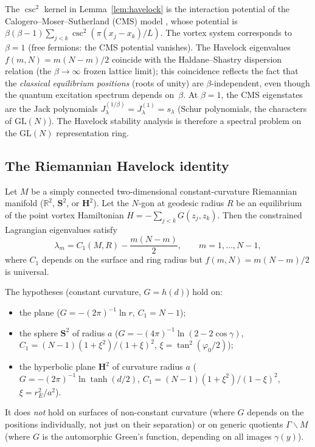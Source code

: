 \begin{remark}
The $\csc^2$ kernel in Lemma~\ref{lem:havelock} is the
interaction potential of the Calogero--Moser--Sutherland (CMS)
model \citep{Sutherland1971, CalogeroJMP1971}, whose potential
is $\beta(\beta{-}1)\sum_{j<k}\csc^2(\pi(x_j{-}x_k)/L)$.
The vortex system corresponds to $\beta = 1$
(free fermions: the CMS potential vanishes).
The Havelock eigenvalues $f(m,N) = m(N{-}m)/2$ coincide with
the Haldane--Shastry dispersion relation (the $\beta \to \infty$
frozen lattice limit); this coincidence reflects the fact that the
\emph{classical equilibrium positions} (roots of unity) are
$\beta$-independent, even though the quantum excitation spectrum
depends on~$\beta$.
At $\beta = 1$, the CMS eigenstates are the Jack polynomials
$J_\lambda^{(1/\beta)} = J_\lambda^{(1)} = s_\lambda$
(Schur polynomials, the characters of $\mathrm{GL}(N)$).
The Havelock stability analysis is therefore a spectral
problem on the $\mathrm{GL}(N)$ representation ring.
\end{remark}

\subsection{The Riemannian Havelock identity}
\label{sec:riemannian}

\begin{theorem}
\label{thm:riemannian-havelock}
Let $M$ be a simply connected two-dimensional
constant-curvature Riemannian manifold
($\mathbb{R}^2$, $\mathbf{S}^2$, or $\mathbf{H}^2$).
Let the $N$-gon at geodesic radius $R$ be an equilibrium of the
point vortex Hamiltonian $H = -\sum_{j<k}G(z_j,z_k)$.
Then the constrained Lagrangian eigenvalues satisfy
\begin{equation}\label{eq:riemannian-havelock}
  \lambda_m = C_1(M, R) - \frac{m(N-m)}{2},
  \qquad m = 1, \ldots, N-1,
\end{equation}
where $C_1$ depends on the surface and ring radius but
$f(m,N) = m(N{-}m)/2$ is universal.
\end{theorem}

\noindent
The hypotheses (constant curvature, $G = h(d)$) hold on:
\begin{itemize}
  \item the plane ($G = -(2\pi)^{-1}\ln r$, $C_1 = N{-}1$);
  \item the sphere $\mathbf{S}^2$ of radius $a$
    ($G = -(4\pi)^{-1}\ln(2{-}2\cos\gamma)$,
    $C_1 = (N{-}1)(1{+}\xi^2)/(1{+}\xi)^2$, $\xi = \tan^2(\varphi_0/2)$);
  \item the hyperbolic plane $\mathbf{H}^2$ of curvature
    radius $a$
    ($G = -(2\pi)^{-1}\ln\tanh(d/2)$,
    $C_1 = (N{-}1)(1{+}\xi^2)/(1{-}\xi)^2$, $\xi = r_E^2/a^2$).
\end{itemize}
It does \emph{not} hold on surfaces of non-constant curvature
(where $G$ depends on the positions individually, not just on
their separation) or on generic quotients $\Gamma\backslash M$
(where $G$ is the automorphic Green's function, depending on all
images $\gamma(y)$).

